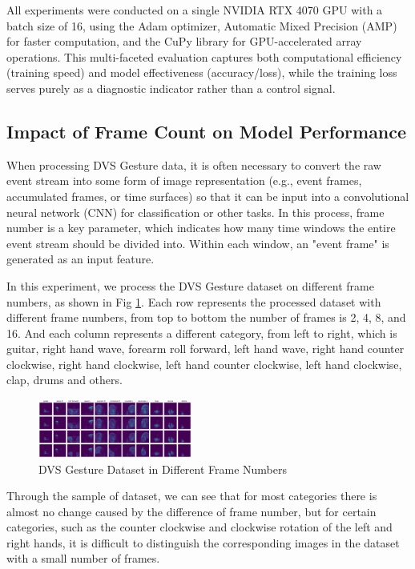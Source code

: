 \documentclass[conference]{IEEEtran}
\begin{document}
All experiments were conducted on a single NVIDIA RTX 4070 GPU with a batch size of 16, using the Adam optimizer, 
Automatic Mixed Precision (AMP) for faster computation, and the CuPy library for GPU-accelerated array operations. 
This multi-faceted evaluation captures both computational efficiency (training speed) and model effectiveness (accuracy/loss), 
while the training loss serves purely as a diagnostic indicator rather than a control signal.

\subsection{Impact of Frame Count on Model Performance}
When processing DVS Gesture data, it is often necessary to convert the raw event stream into some form of image representation (e.g., event frames, accumulated frames, or time surfaces) so that it can be input into a convolutional neural network (CNN) for classification or other tasks. In this process, frame number is a key parameter, which indicates how many time windows the entire event stream should be divided into. Within each window, an "event frame" is generated as an input feature.

In this experiment, we process the DVS Gesture dataset on different frame numbers, as shown in Fig \ref{fig:dvs_gesture_frame_num}. Each row represents the processed dataset with different frame numbers, from top to bottom the number of frames is 2, 4, 8, and 16. And each column represents a different category, from left to right, which is guitar, right hand wave, forearm roll forward, left hand wave, right hand counter clockwise, right hand clockwise, left hand counter clockwise, left hand clockwise, clap, drums and others.
\begin{figure}[htbp]
    \centering
    \includegraphics[width=0.45\textwidth]{figure/dataset.png}
    \caption{DVS Gesture Dataset in Different Frame Numbers}
    \label{fig:dvs_gesture_frame_num}
\end{figure}

Through the sample of dataset, we can see that for most categories there is almost no change caused by the difference of frame number, but for certain categories, such as the counter clockwise and clockwise rotation of the left and right hands, it is difficult to distinguish the corresponding images in the dataset with a small number of frames.
\end{document}
